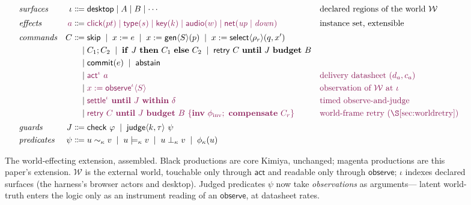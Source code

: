 \documentclass[acmsmall,screen,nonacm]{acmart}
\newcommand{\semeqk}[1]{\mathrel{\sim_{#1}}}
\newcommand{\entailsk}[1]{\mathrel{\models_{#1}}}
\newcommand{\gen}{\mathsf{gen}}
\newcommand{\checkk}{\mathsf{check}}
\newcommand{\judge}{\mathsf{judge}}
\newcommand{\retry}{\mathsf{retry}}
\newcommand{\select}{\mathsf{select}}
\newcommand{\commitc}{\mathsf{commit}}
\newcommand{\abstain}{\mathsf{abstain}}
\newcommand{\actc}{\mathsf{act}}
\newcommand{\observe}{\mathsf{observe}}
\newcommand{\settle}{\mathsf{settle}}
\newcommand{\Skip}{\mathsf{skip}}
\newcommand{\ctx}{\kappa}
\newcommand{\budget}{B}
\newcommand{\worldstore}{\mathcal{W}}
\newcommand{\ext}[1]{\textcolor{extcolor}{#1}}
\theoremstyle{acmdefinition}%
\theoremstyle{acmplain}%
\begin{document}
\begin{figure}[t]
\small
\begin{align*}
&\textit{surfaces} & \iota \Coloneqq{}& \mathsf{desktop} \mid A \mid B \mid \cdots
   && \text{declared regions of the world } \worldstore\\[2pt]
&\textit{effects} & \ext{a} \Coloneqq{}& \ext{\mathsf{click}(pt) \mid \mathsf{type}(s) \mid \mathsf{key}(k) \mid \mathsf{audio}(w) \mid \mathsf{net}(\mathit{up} \mid \mathit{down})}
   && \text{instance set, extensible}\\[2pt]
&\textit{commands} & C \Coloneqq{}& \Skip \;\mid\; x := e \;\mid\; x := \gen\langle S\rangle(p) \;\mid\; x := \select\langle\rho_r\rangle(q, x') \\
& & \mid{}& C_1 ; C_2 \;\mid\; \mathbf{if}\ J\ \mathbf{then}\ C_1\ \mathbf{else}\ C_2
      \;\mid\; \retry\ C\ \mathbf{until}\ J\ \mathbf{budget}\ \budget \\
& & \mid{}& \commitc(e) \;\mid\; \abstain \\
& & \mid{}& \ext{\actc^{\iota}\ a}
      && \ext{\text{delivery datasheet } (d_a, c_a)}\\
& & \mid{}& \ext{x := \observe^{\iota}\langle S\rangle}
      && \ext{\text{observation of } \worldstore \text{ at } \iota}\\
& & \mid{}& \ext{\settle^{\iota}\ \mathbf{until}\ J\ \mathbf{within}\ \delta}
      && \ext{\text{timed observe-and-judge}}\\
& & \mid{}& \ext{\retry\ C\ \mathbf{until}\ J\ \mathbf{budget}\ \budget\
      \{\mathbf{inv}\ \phi_{\mathrm{inv}};\ \mathbf{compensate}\ C_r\}}
      && \ext{\text{world-frame retry (\S\ref{sec:worldretry})}}\\[2pt]
&\textit{guards} & J \Coloneqq{}& \checkk\ \varphi \;\mid\; \judge\langle k,\tau\rangle\ \psi \\
&\textit{predicates} & \psi \Coloneqq{}& u \semeqk{\ctx} v \;\mid\; u \entailsk{\ctx} v \;\mid\; u \perp_{\ctx} v \;\mid\; \phi_{\ctx}(u)
\end{align*}
\caption{The world-effecting extension, assembled. Black productions are
core Kimiya, unchanged; \textcolor{extcolor}{magenta} productions are
this paper's extension. $\worldstore$ is the external world, touchable
only through $\actc$ and readable only through $\observe$; $\iota$
indexes declared surfaces (the harness's browser actors and desktop).
Judged predicates $\psi$ now take \emph{observations} as arguments---
latent world-truth enters the logic only as an instrument reading of an
$\observe$, at datasheet rates.}
\label{fig:extgrammar}
\end{figure}
\end{document}
